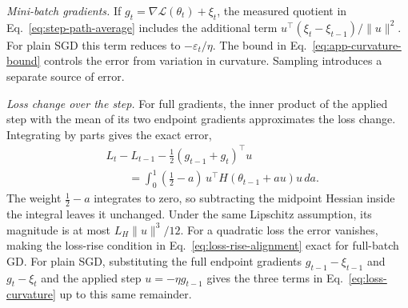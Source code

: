 \emph{Mini-batch gradients.} If $g_t=\nabla\mathcal L(\theta_t)+\xi_t$, the measured quotient in Eq.~\eqref{eq:step-path-average} includes the additional term $u^\top(\xi_t-\xi_{t-1})/\|u\|^2$. For plain SGD this term reduces to $-\varepsilon_t/\eta$. The bound in Eq.~\eqref{eq:app-curvature-bound} controls the error from variation in curvature. Sampling introduces a separate source of error.

\emph{Loss change over the step.} For full gradients, the inner product of the applied step with the mean of its two endpoint gradients approximates the loss change. Integrating by parts gives the exact error,
\begin{equation}
 \begin{aligned}
 &L_t-L_{t-1}-\tfrac12(g_{t-1}+g_t)^\top u\\
 &\qquad=\int_0^1(\tfrac12-a)\,u^\top H(\theta_{t-1}+au)u\,da.
 \end{aligned}
 \label{eq:app-loss-remainder}
\end{equation}
The weight $\tfrac12-a$ integrates to zero, so subtracting the midpoint Hessian inside the integral leaves it unchanged. Under the same Lipschitz assumption, its magnitude is at most $L_H\|u\|^3/12$. For a quadratic loss the error vanishes, making the loss-rise condition in Eq.~\eqref{eq:loss-rise-alignment} exact for full-batch GD. For plain SGD, substituting the full endpoint gradients $g_{t-1}-\xi_{t-1}$ and $g_t-\xi_t$ and the applied step $u=-\eta g_{t-1}$ gives the three terms in Eq.~\eqref{eq:loss-curvature} up to this same remainder.
